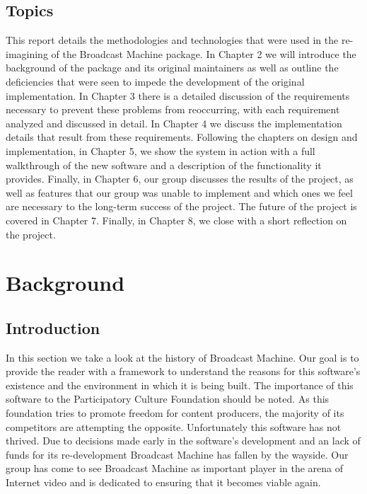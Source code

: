 \documentclass[a4paper,12pt]{report}
\begin{document}
\section{Topics}
This report details the methodologies and technologies that were used in the re-imagining of the Broadcast Machine package.
In Chapter 2 we will introduce the background of the package and its original maintainers as well as outline the deficiencies that were seen to impede the development of the original implementation.
In Chapter 3 there is a detailed discussion of the requirements necessary to prevent these problems from reoccurring, with each requirement analyzed and discussed in detail.
In Chapter 4 we discuss the implementation details that result from these requirements.
Following the chapters on design and implementation, in Chapter 5, we show the system in action with a full walkthrough of the new software and a description of the functionality it provides.
Finally, in Chapter 6, our group discusses the results of the project, as well as features that our group was unable to implement and which ones we feel are necessary to the long-term success of the project. The future of the project is covered in Chapter 7. Finally, in Chapter 8, we close with a short reflection on the project.

\chapter{Background}

\section{Introduction}
In this section we take a look at the history of Broadcast Machine.
Our goal is to provide the reader with a framework to understand the reasons for this software's existence and the environment in which it is being built.
The importance of this software to the Participatory Culture Foundation should be noted.
As this foundation tries to promote freedom for content producers, the majority of its competitors are attempting the opposite.
Unfortunately this software has not thrived.
Due to decisions made early in the software's development and an lack of funds for its re-development Broadcast Machine has fallen by the wayside.
Our group has come to see Broadcast Machine as important player in the arena of Internet video and is dedicated to ensuring that it 
becomes viable again.
\end{document}
